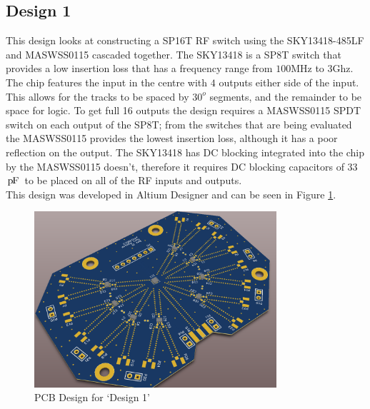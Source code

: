\documentclass[12pt,openany,a4paper]{book}
\newcommand{\pack}	{\hspace{-0.08em}}
\newcommand{\pF}	{\ensuremath{\rm\,p\pack F}}
\begin{document}
\subsection{Design 1}		\label{sec:design1}
This design looks at constructing a SP16T RF switch using the SKY13418-485LF and MASWSS0115 cascaded together. The SKY13418 is a SP8T switch that provides a low insertion loss that has a frequency range from $100$MHz to $3$Ghz.  The chip features the input in the centre with $4$ outputs either side of the input. This allows for the tracks to be spaced by $30^o$ segments, and the remainder to be space for logic. To get full 16 outputs the design requires a MASWSS0115 SPDT switch on each output of the SP8T; from the switches that are being evaluated the MASWSS0115 provides the lowest insertion loss, although it has a poor reflection on the output. The SKY13418 has DC blocking integrated into the chip by the MASWSS0115 doesn't, therefore it requires DC blocking capacitors of $33$\pF \ to be placed on all of the RF inputs and outputs. \\[0.2cm]
This design was developed in Altium Designer and can be seen in Figure \ref{fig:design1}.
\begin{figure}[H]
	\centering
    \includegraphics[width=0.8\textwidth]{design1_pcb.png}
	\caption{PCB Design for `Design 1'}
	\label{fig:design1}
\end{figure} 
\end{document}
